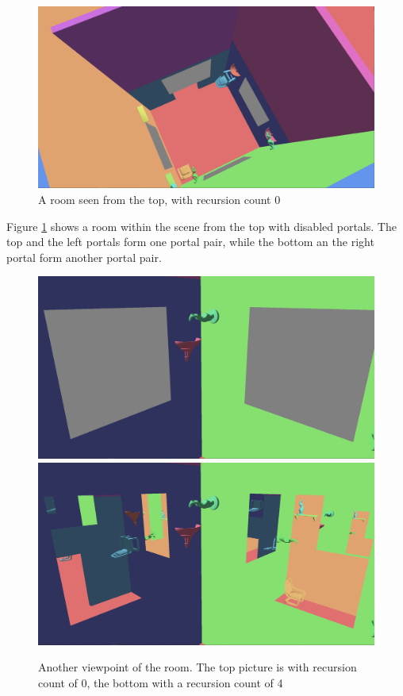 \begin{figure}[H]
	\centering
	\includegraphics[width=\linewidth]{images/room.png}
	\caption{A room seen from the top, with recursion count 0}
	\label{fig:roomlayout}
\end{figure}

Figure \ref{fig:roomlayout} shows a room within the scene from the top with disabled portals. The top and the left portals form one portal pair, while the bottom an the right portal form another portal pair.

\begin{figure}[H]
	\includegraphics[width=\linewidth]{images/roomportalsr0.png}
	\includegraphics[width=\linewidth]{images/roomportals.png}
	\caption{Another viewpoint of the room.  The top picture is with recursion count of 0, the bottom with a recursion count of 4}
	\label{fig:room}
\end{figure}


